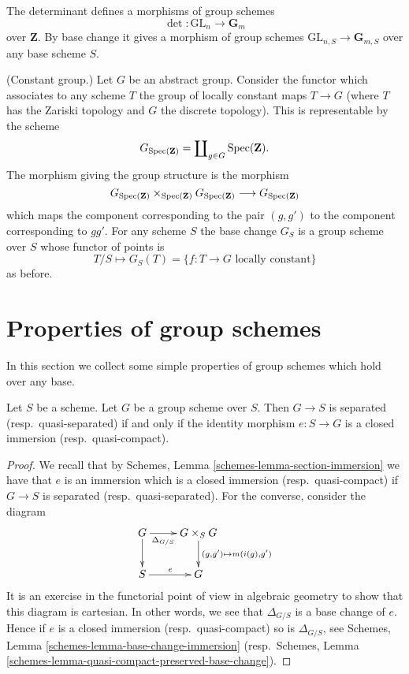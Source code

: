 \begin{example}
\label{example-determinant}
The determinant defines a morphisms of group schemes
$$
\det : \text{GL}_n \longrightarrow \mathbf{G}_m
$$
over $\mathbf{Z}$. By base change it gives a morphism
of group schemes $\text{GL}_{n, S} \to \mathbf{G}_{m, S}$
over any base scheme $S$.
\end{example}

\begin{example}
\label{example-constant-group}
(Constant group.)
Let $G$ be an abstract group. Consider the functor
which associates to any scheme $T$ the group
of locally constant maps $T \to G$ (where $T$ has the Zariski topology
and $G$ the discrete topology). This is representable by the scheme
$$
G_{\mathop{\rm Spec}(\mathbf{Z})} =
\coprod\nolimits_{g \in G} \mathop{\rm Spec}(\mathbf{Z}).
$$
The morphism giving the group structure is the morphism
$$
G_{\mathop{\rm Spec}(\mathbf{Z})}
\times_{\mathop{\rm Spec}(\mathbf{Z})}
G_{\mathop{\rm Spec}(\mathbf{Z})}
\longrightarrow
G_{\mathop{\rm Spec}(\mathbf{Z})}
$$
which maps the component corresponding to the pair $(g, g')$ to the
component corresponding to $gg'$. For any scheme $S$ the base change
$G_S$ is a group scheme over $S$ whose functor of points is
$$
T/S
\longmapsto
G_S(T) = \{f : T \to G \text{ locally constant}\}
$$
as before.
\end{example}





\section{Properties of group schemes}
\label{section-properties-group-schemes}

\noindent
In this section we collect some simple properties of group schemes which
hold over any base.

\begin{lemma}
\label{lemma-group-scheme-separated}
Let $S$ be a scheme.
Let $G$ be a group scheme over $S$.
Then $G \to S$ is separated (resp.\ quasi-separated) if and only if
the identity morphism $e : S \to G$ is a closed immersion
(resp.\ quasi-compact).
\end{lemma}

\begin{proof}
We recall that by
Schemes, Lemma \ref{schemes-lemma-section-immersion}
we have that $e$ is an immersion which is a closed immersion
(resp.\ quasi-compact) if $G \to S$ is separated (resp.\ quasi-separated).
For the converse, consider the diagram
$$
\xymatrix{
G \ar[r]_-{\Delta_{G/S}} \ar[d] &
G \times_S G \ar[d]^{(g, g') \mapsto m(i(g), g')} \\
S \ar[r]^e & G
}
$$
It is an exercise in the functorial point of view in algebraic geometry
to show that this diagram is cartesian. In other words, we see that
$\Delta_{G/S}$ is a base change of $e$. Hence if $e$ is a
closed immersion (resp.\ quasi-compact) so is $\Delta_{G/S}$, see
Schemes, Lemma \ref{schemes-lemma-base-change-immersion}
(resp.\ Schemes, Lemma
\ref{schemes-lemma-quasi-compact-preserved-base-change}).
\end{proof}

